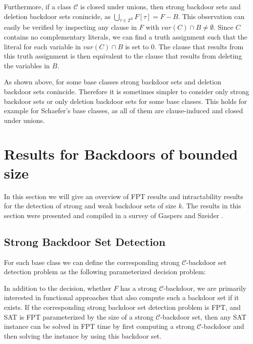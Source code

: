 \documentclass[11pt,a4paper]{article}
\makeatletter
\newcommand{\problemtitle}[1]{\gdef\@problemtitle{#1}}%
\newcommand{\probleminput}[1]{\gdef\@probleminput{#1}}%
\newcommand{\problemquestion}[1]{\gdef\@problemquestion{#1}}%
\newcommand{\problemparam}[1]{\gdef\@problemparam{#1}}%
\theoremstyle{definition}
\theoremstyle{proposition}
\makeatother
\begin{document}
Furthermore, if a class $\mathcal{C}$ is closed under unions, then strong backdoor sets and deletion backdoor sets conincide, as $\bigcup_{\tau \in 2^B} F[\tau] = F - B$. This observation can easily be verified by inspecting any clause in $F$ with $var(C) \cap B \neq \emptyset$. Since $C$ contains no complementary literals, we can find a truth assignment such that the literal for each variable in $var(C) \cap B$ is set to 0. The clause that results from this truth assignment is then equivalent to the clause that results from deleting the variables in $B$. 

As shown above, for some base classes strong backdoor sets and deletion backdoor sets conincide. Therefore it is sometimes simpler to consider only strong backdoor sets or only deletion backdoor sets for some base classes. This holds for example for Schaefer's base classes, as all of them are clause-induced and closed under unions. 
\section{Results for Backdoors of bounded size}
\label{sec:boundedbackdoors}

In this section we will give an overview of FPT results and intractability results for the detection of strong and weak backdoor sets of size $k$. The results in this section were presented and compiled in a survey of Gaspers and Szeider \cite{Gaspers2012}. 

\subsection{Strong Backdoor Set Detection}
\label{sec:strongdetection}
For each base class we can define the corresponding strong $\mathcal{C}$-backdoor set detection problem as the following parameterized decision problem: 
\begin{csproblemparam}
        \problemtitle{Strong $\mathcal{C}$-Backdoor Set Detection}
        \probleminput{A CNF formula $F$ and an integer $k \geq 0$}
        \problemparam{The integer $k$}
        \problemquestion{Does $F$ have a strong $\mathcal{C}$-backdoor set of size at most $k$?}
\end{csproblemparam}
In addition to the decision, whether $F$ has a strong $\mathcal{C}$-backdoor, we are primarily interested in functional approaches that also compute such a backdoor set if it exists. If the corresponding strong backdoor set detection problem is FPT, and SAT is FPT parameterized by the size of a strong $\mathcal{C}$-backdoor set, then any SAT instance can be solved in FPT time by first computing a strong $\mathcal{C}$-backdoor and then solving the instance by using this backdoor set. 
\end{document}
